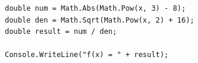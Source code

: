 \documentclass[14pt]{extarticle}
\begin{document}
\begin{enumerate}[itemsep=3em]
\begin{boxSolution}
\begin{english}
\begin{verbatim}
double num = Math.Abs(Math.Pow(x, 3) - 8);
double den = Math.Sqrt(Math.Pow(x, 2) + 16);
double result = num / den;

Console.WriteLine("f(x) = " + result);
    \end{verbatim}
    \end{english}
    \end{boxSolution}
    \fi
    \fi

\end{enumerate}
\end{document}
